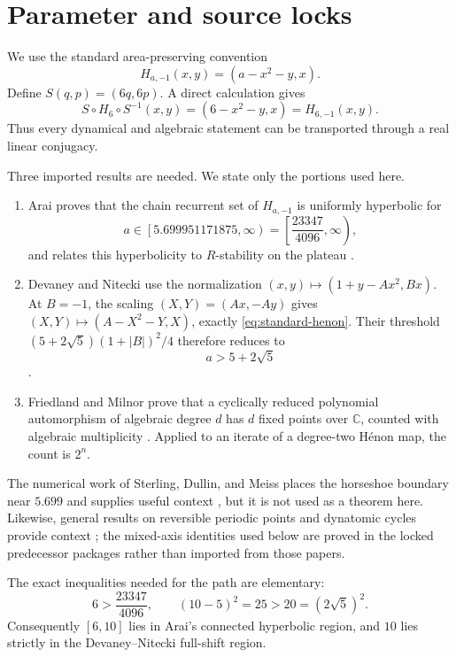 \section{Parameter and source locks}\label{sec:sources}

We use the standard area-preserving convention
\begin{equation}\label{eq:standard-henon}
H_{a,-1}(x,y)=(a-x^2-y,x).
\end{equation}
Define $S(q,p)=(6q,6p)$.  A direct calculation gives
\begin{equation}\label{eq:scaling}
S\circ H_6\circ S^{-1}(x,y)=(6-x^2-y,x)=H_{6,-1}(x,y).
\end{equation}
Thus every dynamical and algebraic statement can be transported through a
real linear conjugacy.

Three imported results are needed.  We state only the portions used here.

\begin{enumerate}
\item Arai proves that the chain recurrent set of $H_{a,-1}$ is uniformly
hyperbolic for
\begin{equation}\label{eq:arai-endpoint}
a\in\left[5.699951171875,\infty\right)
=\left[\frac{23347}{4096},\infty\right),
\end{equation}
and relates this hyperbolicity to $R$-stability on the plateau
\cite[Theorem~2]{Arai2007}.
\item Devaney and Nitecki use the normalization
$(x,y)\mapsto(1+y-Ax^2,Bx)$.  At $B=-1$, the scaling
$(X,Y)=(Ax,-Ay)$ gives $(X,Y)\mapsto(A-X^2-Y,X)$, exactly
\eqref{eq:standard-henon}.  Their threshold
$(5+2\sqrt5)(1+|B|)^2/4$ therefore reduces to
\begin{equation}\label{eq:DN-threshold}
a>5+2\sqrt5
\end{equation}
\cite{DevaneyNitecki1979}.
\item Friedland and Milnor prove that a cyclically reduced polynomial
automorphism of algebraic degree $d$ has $d$ fixed points over $\mathbb C$,
counted with algebraic multiplicity \cite[Theorem~3.1]{FriedlandMilnor1989}.
Applied to an iterate of a degree-two H\'enon map, the count is $2^n$.
\end{enumerate}

The numerical work of Sterling, Dullin, and Meiss places the horseshoe
boundary near $5.699$ and supplies useful context \cite{SterlingDullinMeiss1999},
but it is not used as a theorem here.  Likewise, general results on
reversible periodic points and dynatomic cycles provide context
\cite{Kang2014,Hutz2010}; the mixed-axis identities used below are proved in
the locked predecessor packages rather than imported from those papers.

The exact inequalities needed for the path are elementary:
\[
6>\frac{23347}{4096},\qquad
(10-5)^2=25>20=(2\sqrt5)^2.
\]
Consequently $[6,10]$ lies in Arai's connected hyperbolic region, and $10$
lies strictly in the Devaney--Nitecki full-shift region.
